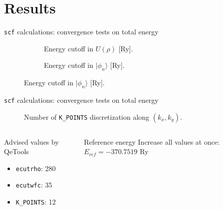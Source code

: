 \documentclass[dvipsnames]{beamer}
\begin{document}
	\section{Results}
	
	\begin{frame}{\texttt{scf} calculations: convergence tests on total energy}
	\begin{figure}
	\begin{subfigure}{\textwidth}
	\resizebox{\textwidth}{0.35\textheight}{
		
	}
	\caption{Energy cutoff in $U(\rho)$ [\si{Ry}].}
	\end{subfigure}
	
	\begin{subfigure}{\textwidth}
	\resizebox{\textwidth}{0.35\textheight}{
		
	}
	\caption{Energy cutoff in $|\phi_n\rangle$ [\si{Ry}].}
	\end{subfigure}
	\end{figure}
	\end{frame}
	
	\begin{frame}{\texttt{scf} calculations: convergence tests on total energy}
	\begin{figure}
	\resizebox{\textwidth}{0.35\textheight}{
		
	}
	\caption{Number of \texttt{K\_POINTS} discretization along $(k_x, k_y)$.}
	\end{figure}
	\begin{columns}[T]
	\begin{column}{0.5\textwidth}
	\begin{block}{Advised values by QeTools}
	\begin{itemize}
	\item \texttt{ecutrho}: 280
	\item \texttt{ecutwfc}: 35
	\item \texttt{K\_POINTS}: 12
	\end{itemize}
	\end{block}
	\end{column}
	\begin{column}{0.5\textwidth}
	\begin{exampleblock}{Reference energy}
	Increase all values at once:
	$E_{ref} = -370.7519$ \si{Ry}
	\end{exampleblock}
	\end{column}
	\end{columns}
	\end{frame}
	
\end{document}
